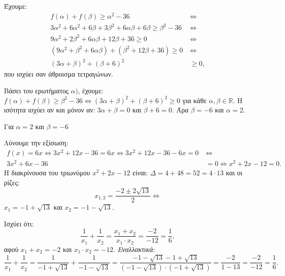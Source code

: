 
\begin{alist}
\item Έχουμε:
\begin{align*}
f(\alpha) + f(\beta) \ge \alpha^2 - 36 \ &\Leftrightarrow \\
3\alpha^2 + 6\alpha^2 + 6\beta + 3\beta^2 + 6\alpha\beta + 6\beta \ge \beta^2 - 36 \ &\Leftrightarrow \\
9\alpha^2 + 2\beta^2 + 6\alpha\beta + 12\beta + 36 \ge 0 \ &\Leftrightarrow \\
(9\alpha^2 + \beta^2 + 6\alpha\beta) + (\beta^2 + 12\beta + 36) \ge 0 \ &\Leftrightarrow \\
(3\alpha + \beta)^2 + (\beta + 6)^2 &\ge 0,
\end{align*}
που ισχύει σαν άθροισμα τετραγώνων.
\item Βάσει του ερωτήματος $\alpha)$, έχουμε:
$f(\alpha) + f(\beta) \ge \beta^2 - 36 \Leftrightarrow (3\alpha + \beta)^2 + (\beta + 6)^2 \ge 0$ για κάθε $\alpha, \beta \in \mathbb{R}$.
Η ισότητα ισχύει αν και μόνον αν: $3\alpha + \beta = 0$ και $\beta + 6 = 0$.
Άρα $\beta = -6$ και $\alpha = 2$.
\item Για $\alpha = 2$ και $\beta = -6$
\begin{rlist}
\item Λύνουμε την εξίσωση:
\begin{align*}
f(x) = 6x \Leftrightarrow 3x^2 + 12x - 36 = 6x \Leftrightarrow 3x^2 + 12x - 36 - 6x = 0 \ &\Leftrightarrow \\
3x^2 + 6x - 36 &= 0 \Leftrightarrow x^2 + 2x - 12 = 0.
\end{align*}
Η διακρίνουσα του τριωνύμου $x^2 + 2x - 12$ είναι: $\Delta = 4 + 48 = 52 = 4 \cdot 13$
και οι ρίζες:
\[x_{1,2} = \dfrac{-2 \pm 2\sqrt{13}}{2} \Leftrightarrow\]
$x_1 = -1 + \sqrt{13}$ και $x_2 = -1 - \sqrt{13}$.
\item Ισχύει ότι:
\[\dfrac{1}{x_1} + \dfrac{1}{x_2} = \dfrac{x_1 + x_2}{x_1 \cdot x_2} = \dfrac{-2}{-12} = \dfrac{1}{6},\]
αφού $x_1 + x_2 = -2$ και $x_1 \cdot x_2 = -12$.
\textit{Εναλλακτικά}:
\[\dfrac{1}{x_1} + \dfrac{1}{x_2} = \dfrac{1}{-1 + \sqrt{13}} + \dfrac{1}{-1 - \sqrt{13}} = \dfrac{-1 - \sqrt{13} - 1 + \sqrt{13}}{(-1 - \sqrt{13}) \cdot (-1 + \sqrt{13})} = \dfrac{-2}{1 - 13} = \dfrac{-2}{-12} = \dfrac{1}{6}.\]
\end{rlist}
\end{alist}

